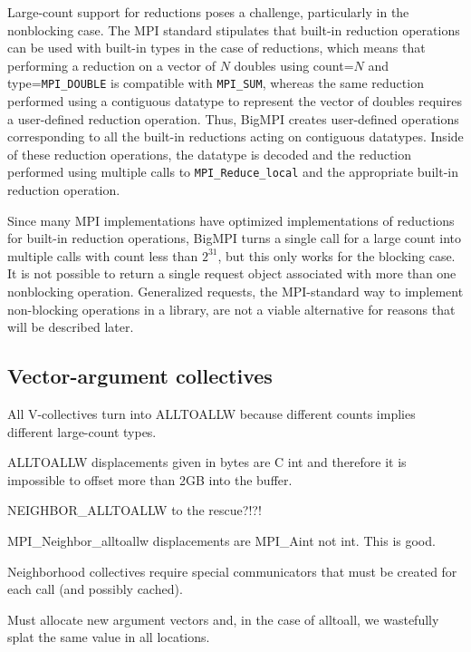 Large-count support for reductions poses a challenge, particularly in the nonblocking case.
The MPI standard stipulates that built-in reduction operations can be used with built-in types
in the case of reductions, which means that performing a reduction on a vector of $N$
doubles using count=$N$ and type=\texttt{MPI\_DOUBLE} is compatible with \texttt{MPI\_SUM},
whereas the same reduction performed using a contiguous datatype to represent the vector
of doubles requires a user-defined reduction operation.
Thus, BigMPI creates user-defined operations corresponding to all the built-in reductions
acting on contiguous datatypes.  Inside of these reduction operations, the datatype is
decoded and the reduction performed using multiple calls to \texttt{MPI\_Reduce\_local}
and the appropriate built-in reduction operation.

Since many MPI implementations have optimized implementations of reductions for
built-in reduction operations, BigMPI turns a single call for a large count into multiple
calls with count less than $2^{31}$, but this only works for the blocking case.
It is not possible to return a single request object associated with more than one
nonblocking operation.  Generalized requests, the MPI-standard way to implement non-blocking operations in a library,  are not a viable alternative for
reasons that will be described later.




\subsection{Vector-argument collectives}

All V-collectives turn into ALLTOALLW because different counts implies different large-count types.

ALLTOALLW displacements given in bytes are C int and therefore it is impossible to offset more than 2GB into the buffer.

NEIGHBOR\_ALLTOALLW to the rescue?!?!

MPI\_Neighbor\_alltoallw displacements are MPI\_Aint not int.  This is good.

Neighborhood collectives require special communicators that must be created for each call (and possibly cached).

Must allocate new argument vectors and, in the case of alltoall, we wastefully splat the same value in all locations.

